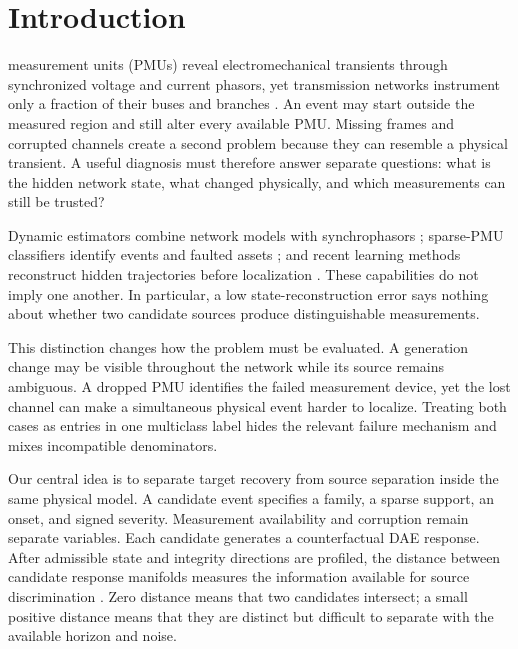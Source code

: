 \section{Introduction}
\label{sec:introduction}

 measurement units (PMUs) reveal electromechanical transients through synchronized voltage and current phasors, yet transmission networks instrument only a fraction of their buses and branches \cite{phadke2008synchronized,zhao2019dse}. An event may start outside the measured region and still alter every available PMU. Missing frames and corrupted channels create a second problem because they can resemble a physical transient. A useful diagnosis must therefore answer separate questions: what is the hidden network state, what changed physically, and which measurements can still be trusted?

Dynamic estimators combine network models with synchrophasors \cite{zhao2019dse,katanic2024recursive}; sparse-PMU classifiers identify events and faulted assets \cite{pandey2020realtime,yildiz2024few}; and recent learning methods reconstruct hidden trajectories before localization \cite{rimkus2025gnn,zhai2025partial}. These capabilities do not imply one another. In particular, a low state-reconstruction error says nothing about whether two candidate sources produce distinguishable measurements.

This distinction changes how the problem must be evaluated. A generation change may be visible throughout the network while its source remains ambiguous. A dropped PMU identifies the failed measurement device, yet the lost channel can make a simultaneous physical event harder to localize. Treating both cases as entries in one multiclass label hides the relevant failure mechanism and mixes incompatible denominators.

Our central idea is to separate target recovery from source separation inside the same physical model. A candidate event specifies a family, a sparse support, an onset, and signed severity. Measurement availability and corruption remain separate variables. Each candidate generates a counterfactual DAE response. After admissible state and integrity directions are profiled, the distance between candidate response manifolds measures the information available for source discrimination \cite{eriksson2013diagnosability,scharf1994matched}. Zero distance means that two candidates intersect; a small positive distance means that they are distinct but difficult to separate with the available horizon and noise.

